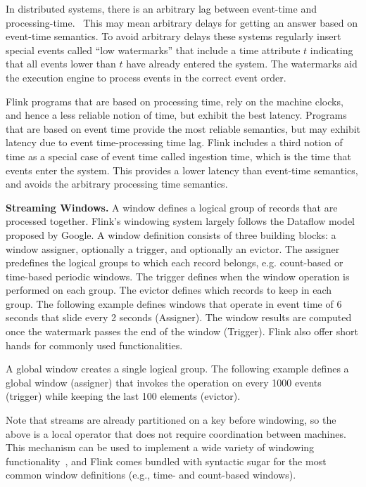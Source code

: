 \documentclass{sig-alternate}
\begin{document}
In distributed systems, there is an arbitrary lag between event-time and processing-time.~\cite{akidau2015dataflow} This may mean arbitrary delays for getting an answer based on event-time semantics. To avoid arbitrary delays these systems regularly insert special events called ``low watermarks''  that include a time attribute $t$ indicating that all events lower than $t$ have already entered the system. The watermarks aid the execution engine to process events in the correct event order. 

Flink programs that are based on processing time, rely on the machine clocks, and hence a less reliable notion of time, but exhibit the best latency. Programs that are based on event time provide the most reliable semantics, but may exhibit latency due to event time-processing time lag. Flink includes a third notion of time as a special case of event time called ingestion time, which is the time that events enter the system. This provides  a lower latency than event-time semantics, and avoids the arbitrary processing time semantics.

\textbf{Streaming Windows.} A window defines a logical group of records that are processed together. Flink's windowing system largely follows the Dataflow model~\cite{akidau2015dataflow} proposed by Google. A window definition consists of three building blocks: a window assigner, optionally a trigger, and optionally an evictor. 
The assigner predefines the logical groups to which each record belongs, e.g. count-based or time-based periodic windows. The trigger defines when the window operation is performed on each group. The evictor defines which records to keep in each group. The following example defines windows that operate in event time of 6 seconds that slide every 2 seconds (Assigner). The window results are computed once the watermark passes the end of the window (Trigger). Flink also offer short hands for commonly used functionalities.



A global window creates a single logical group. The following example defines a global window (assigner) that invokes the operation on every 1000 events (trigger) while keeping the last 100 elements (evictor). 



Note that streams are already partitioned on a key before windowing, so the above is a local operator that does not require coordination between machines. This mechanism can be used to implement a wide variety of windowing functionality~\cite{akidau2015dataflow}, and Flink comes bundled with syntactic sugar for the most common window definitions (e.g., time- and count-based windows). 
\end{document}

